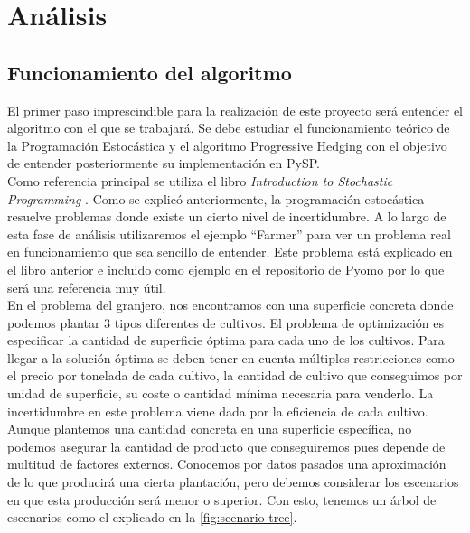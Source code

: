 \chapter{Análisis}
\label{ch:analisis}

\section{Funcionamiento del algoritmo}


El primer paso imprescindible para la realización de este proyecto será entender el algoritmo con el que se trabajará. Se debe estudiar el funcionamiento teórico de la Programación Estocástica y el algoritmo Progressive Hedging con el objetivo de entender posteriormente su implementación en PySP. \\

Como referencia principal se utiliza el libro {\it Introduction to Stochastic Programming} \cite{stochasticProgramming}. Como se explicó anteriormente, la programación estocástica resuelve problemas donde existe un cierto nivel de incertidumbre. A lo largo de esta fase de análisis utilizaremos el ejemplo ``Farmer'' para ver un problema real en funcionamiento que sea sencillo de entender. Este problema está explicado en el libro anterior e incluido como ejemplo en el repositorio de Pyomo por lo que será una referencia muy útil.\\

En el problema del granjero, nos encontramos con una superficie concreta donde podemos plantar 3 tipos diferentes de cultivos. El problema de optimización es especificar la cantidad de superficie óptima para cada uno de los cultivos. Para llegar a la solución óptima se deben tener en cuenta múltiples restricciones como el precio por tonelada de cada cultivo, la cantidad de cultivo que conseguimos por unidad de superficie, su coste o cantidad mínima necesaria para venderlo. La incertidumbre en este problema viene dada por la eficiencia de cada cultivo. Aunque plantemos una cantidad concreta en una superficie específica, no podemos asegurar la cantidad de producto que conseguiremos pues depende de multitud de factores externos. Conocemos por datos pasados una aproximación de lo que producirá una cierta plantación, pero debemos considerar los escenarios en que esta producción será menor o superior. Con esto, tenemos un árbol de escenarios como el explicado en la \autoref{fig:scenario-tree}.\\

